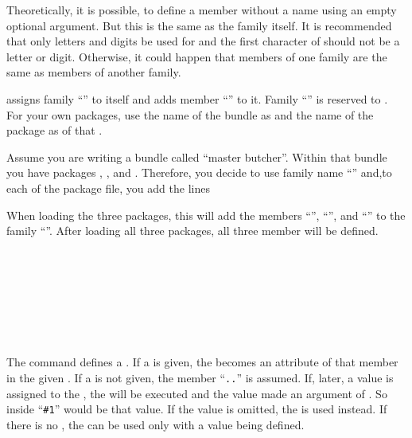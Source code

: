 Theoretically, it is possible, to define a member without a name using an
empty optional  argument. But this is the same as the
family itself. It is recommended that only letters and digits be used for
 and the first character of  should not be
a letter or digit. Otherwise, it could happen that members of one family are
the same as members of another family.

 assigns family ``'' to itself and adds member
``'' to it. Family ``'' is reserved to
\KOMAScript{}. For your own packages, use the name of the bundle as
 and the name of the package as  of that
.
%
\begin{Example}
  Assume you are writing a bundle called ``master butcher''. Within that
  bundle you have packages , , and
  . Therefore, you decide to use family name
  ``'' and,to each of the package file, you add the lines
\begin{lstcode}
\end{lstcode}
  When loading the three packages, this will
  add the members ``'', ``'',
  and ``'' to the family ``''. After
  loading all three packages, all three member will be defined.
\end{Example}
%
%
%


\begin{Declaration}
  \\
  \\
  \\
  \\
  \\
  \\
\end{Declaration}
%
%
%
%
%
%
The command  defines a . If a  is given, the  becomes an attribute of that member in the
given . If a  is not given, the member
``\texttt{.}\texttt{.}'' is assumed. If,
later, a value is assigned to the , the  will be
executed and the value made an argument of . So inside
 ``\lstinline{#1}'' would be that value. If the value is
omitted, the  is used instead. If there is no ,
the  can be used only with a value being defined.

